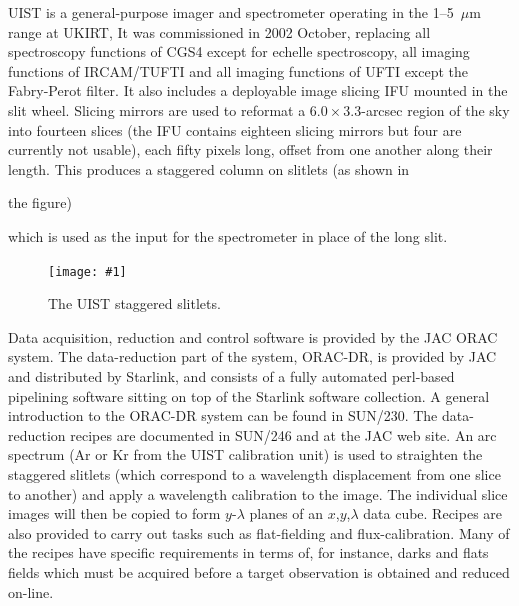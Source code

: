 \documentclass[twoside,11pt]{article}
\newcommand{\htmladdnormallink}[2]{#1}
\newcommand{\htmladdimg}[1]{}
\newcommand{\xref}[3]{#1}
\newcommand{\myfig} [5] {
  \begin{figure}
    \centering\texttt{[image: \#1]}
    \typeout{#1 inserted on page \arabic{page}}
    \caption{\label{#4}#5}
  \end{figure}
  }
\newcommand{\myfig}[5]{
    \label{#4} \htmladdimg{#3}\\
    Figure: #5\\
    }
\begin{document}
UIST is a general-purpose imager and spectrometer operating in the
1--5~$\mu$m range at
\htmladdnormallink{UKIRT}{http://www.jach.hawaii.edu/UKIRT/}, It was
commissioned in 2002 October, replacing all spectroscopy functions of
CGS4 except for echelle spectroscopy, all imaging functions of
IRCAM/TUFTI and all imaging functions of UFTI except the Fabry-Perot
filter.  It also includes a deployable image slicing IFU mounted in
the slit wheel.  Slicing mirrors are used to reformat a
$6.0\times3.3$-arcsec region of the sky into fourteen slices (the IFU
contains eighteen slicing mirrors but four are currently not usable),
each fifty pixels long, offset from one another along their length.  This
produces a staggered column on slitlets (as shown in
\begin{htmlonly}
the figure)
\end{htmlonly}
 which is used as the input for the
spectrometer in place of the long slit.

\myfig{sc16_uist.eps}{height=0.4\textheight}{sc16_uist.gif}{sc16_uist_fig}{The UIST staggered slitlets.} 

Data acquisition, reduction and control software is provided by the
\htmladdnormallink{JAC}{http://www.jach.hawaii.edu/} ORAC system.  The
data-reduction part of the system,
\htmladdnormallink{ORAC-DR}{http://www.oracdr.org},
is provided by JAC and distributed by Starlink, and consists of a 
fully automated perl-based \htmladdnormallink{pipelining
software}{http://monet.astro.uiuc.edu/adass98/Proceedings/economouf/} sitting on top of the Starlink software
collection.  A general introduction to the ORAC-DR system can be found
in \xref{SUN/230}{sun230}{}.  The data-reduction recipes are 
documented in \xref{SUN/246}{sun246}{} and at the 
\htmladdnormallink{JAC web
site}{http://www.jach.hawaii.edu/UKIRT/instruments/uist/ifu/uistoracdr.html}.
An arc spectrum (Ar or Kr from the UIST calibration unit) is used to
straighten the staggered slitlets (which correspond to a wavelength
displacement from one slice to another) and apply a wavelength
calibration to the image.  The individual slice images will then be
copied to form $y$-$\lambda$ planes of an $x$,$y$,$\lambda$ data cube.
Recipes are also provided to carry out tasks such as flat-fielding and
flux-calibration.  Many of the recipes have specific requirements in
terms of, for instance, darks and flats fields which must be acquired
before a target observation is obtained and reduced on-line.
\end{document}
